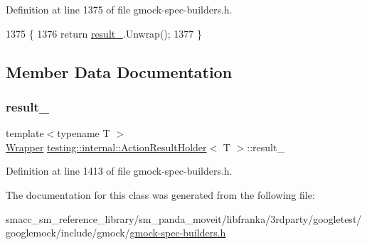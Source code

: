 Definition at line 1375 of file gmock-\/spec-\/builders.\+h.


\begin{DoxyCode}
1375              \{
1376     \textcolor{keywordflow}{return} \hyperlink{classtesting_1_1internal_1_1ActionResultHolder_a76fc150d4247a041353cdd859976198b}{result\_}.Unwrap();
1377   \}
\end{DoxyCode}


\subsection{Member Data Documentation}
\mbox{\label{classtesting_1_1internal_1_1ActionResultHolder_a76fc150d4247a041353cdd859976198b}} 
\subsubsection{\texorpdfstring{result\+\_\+}{result\_}}
{\footnotesize\ttfamily template$<$typename T $>$ \\
\hyperlink{classtesting_1_1internal_1_1ActionResultHolder_aa483b488570efd86657857501dce2b1d}{Wrapper} \hyperlink{classtesting_1_1internal_1_1ActionResultHolder}{testing\+::internal\+::\+Action\+Result\+Holder}$<$ T $>$\+::result\+\_\+\hspace{0.3cm}{\ttfamily [private]}}



Definition at line 1413 of file gmock-\/spec-\/builders.\+h.



The documentation for this class was generated from the following file\+:\begin{DoxyCompactItemize}
\item 
smacc\+\_\+sm\+\_\+reference\+\_\+library/sm\+\_\+panda\+\_\+moveit/libfranka/3rdparty/googletest/googlemock/include/gmock/\hyperlink{gmock-spec-builders_8h}{gmock-\/spec-\/builders.\+h}\end{DoxyCompactItemize}
